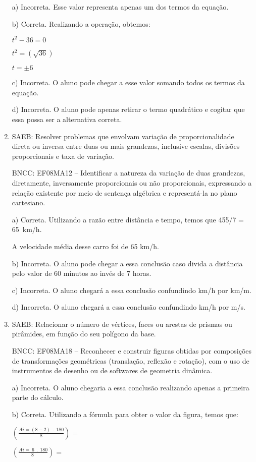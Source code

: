 \begin{enumerate}
a) Incorreta. Esse valor representa apenas um dos termos da
equação.

b) Correta. Realizando a operação, obtemos:

$t^2 - 36 = 0$

$t^2 = (\sqrt{36})$

$t = ± 6$

c) Incorreta. O aluno pode chegar a esse valor somando todos os
termos da equação.

d) Incorreta. O aluno pode apenas retirar o termo quadrático e
cogitar que essa possa ser a alternativa correta.

\item SAEB: Resolver problemas que envolvam variação de proporcionalidade
direta ou inversa entre duas ou mais grandezas, inclusive escalas,
divisões proporcionais e taxa de variação.

BNCC: EF08MA12 -- Identificar a natureza da variação de duas grandezas,
diretamente, inversamente proporcionais ou não proporcionais,
expressando a relação existente por meio de sentença algébrica e
representá-la no plano cartesiano.

a) Correta. Utilizando a razão entre distância e tempo,
temos que 455/7 = 65~km/h.

A velocidade média desse carro foi de 65 km/h.

b) Incorreta. O aluno pode chegar a essa conclusão caso divida a
distância pelo valor de 60 minutos ao invés de 7 horas.

c) Incorreta. O aluno chegará a essa conclusão confundindo km/h por
km/m.

d) Incorreta. O aluno chegará a essa conclusão confundindo km/h por
m/s.

\item SAEB: Relacionar o número de vértices, faces ou arestas de prismas ou
pirâmides, em função do seu polígono da base.

BNCC: EF08MA18 -- Reconhecer e construir figuras obtidas por composições
de transformações geométricas (translação, reflexão e rotação), com o
uso de instrumentos de desenho ou de softwares de geometria dinâmica.

a) Incorreta. O aluno chegaria a essa conclusão realizando apenas a
primeira parte do cálculo.

b) Correta. Utilizando a fórmula para obter o valor da figura,
temos que:

$(\frac{Ai = \left( 8 - 2 \right)\ \ .\ \ 180}{8}) =$

$(\frac{Ai = \ 6\ \ .\ \ 180}{8\ }) =$


\end{enumerate}
